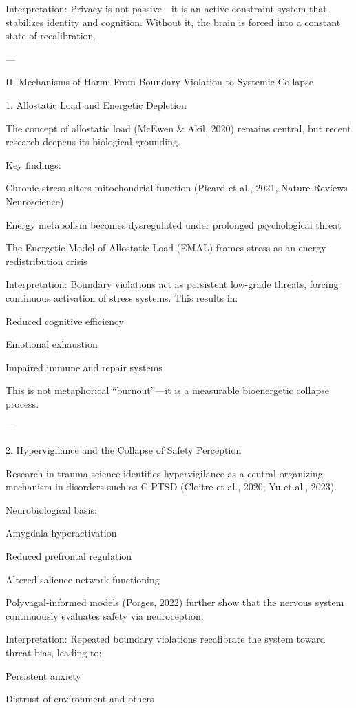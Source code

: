 Interpretation:
Privacy is not passive—it is an active constraint system that stabilizes identity and cognition. Without it, the brain is forced into a constant state of recalibration.


---

II. Mechanisms of Harm: From Boundary Violation to Systemic Collapse

1. Allostatic Load and Energetic Depletion

The concept of allostatic load (McEwen & Akil, 2020) remains central, but recent research deepens its biological grounding.

Key findings:

Chronic stress alters mitochondrial function (Picard et al., 2021, Nature Reviews Neuroscience)

Energy metabolism becomes dysregulated under prolonged psychological threat

The Energetic Model of Allostatic Load (EMAL) frames stress as an energy redistribution crisis


Interpretation:
Boundary violations act as persistent low-grade threats, forcing continuous activation of stress systems. This results in:

Reduced cognitive efficiency

Emotional exhaustion

Impaired immune and repair systems


This is not metaphorical “burnout”—it is a measurable bioenergetic collapse process.


---

2. Hypervigilance and the Collapse of Safety Perception

Research in trauma science identifies hypervigilance as a central organizing mechanism in disorders such as C-PTSD (Cloitre et al., 2020; Yu et al., 2023).

Neurobiological basis:

Amygdala hyperactivation

Reduced prefrontal regulation

Altered salience network functioning


Polyvagal-informed models (Porges, 2022) further show that the nervous system continuously evaluates safety via neuroception.

Interpretation:
Repeated boundary violations recalibrate the system toward threat bias, leading to:

Persistent anxiety

Distrust of environment and others

